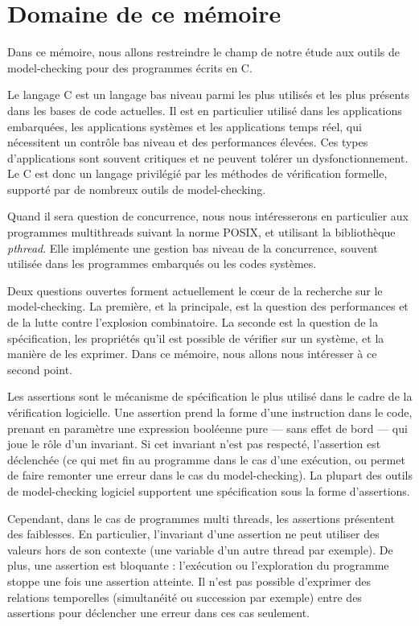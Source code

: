 \section{Domaine de ce mémoire}

Dans ce mémoire, nous allons restreindre le champ de notre étude aux
outils de model-checking pour des programmes écrits en C.

Le langage C est un langage bas niveau parmi les plus utilisés et les
plus présents dans les bases de code actuelles. Il est en particulier
utilisé dans les applications embarquées, les applications systèmes et
les applications temps réel, qui nécessitent un contrôle bas niveau et
des performances élevées. Ces types d'applications sont souvent
critiques et ne peuvent tolérer un dysfonctionnement. Le C est donc un
langage privilégié par les méthodes de vérification formelle, supporté
par de nombreux outils de model-checking.

Quand il sera question de concurrence, nous nous intéresserons en
particulier aux programmes multithreads suivant la norme POSIX, et
utilisant la bibliothèque \emph{pthread}. Elle implémente une gestion
bas niveau de la concurrence, souvent utilisée dans les programmes
embarqués ou les codes systèmes.

Deux questions ouvertes forment actuellement le cœur de la recherche
sur le model-checking. La première, et la principale, est la question
des performances et de la lutte contre l'explosion combinatoire. La
seconde est la question de la spécification, les propriétés qu'il est
possible de vérifier sur un système, et la manière de les exprimer. Dans
ce mémoire, nous allons nous intéresser à ce second point.

Les assertions sont le mécanisme de spécification le plus utilisé dans
le cadre de la vérification logicielle. Une assertion prend la forme
d'une instruction dans le code, prenant en paramètre une expression
booléenne pure --- sans effet de bord --- qui joue le rôle d'un
invariant. Si cet invariant n'est pas respecté, l'assertion est
déclenchée (ce qui met fin au programme dans le cas d'une exécution, ou
permet de faire remonter une erreur dans le cas du model-checking). La
plupart des outils de model-checking logiciel supportent une
spécification sous la forme d'assertions.

Cependant, dans le cas de programmes multi threads, les assertions
présentent des faiblesses. En particulier, l'invariant d'une assertion
ne peut utiliser des valeurs hors de son contexte (une variable d'un
autre thread par exemple). De plus, une assertion est bloquante :
l'exécution ou l'exploration du programme stoppe une fois une assertion
atteinte. Il n'est pas possible d'exprimer des relations temporelles
(simultanéité ou succession par exemple) entre des assertions pour
déclencher une erreur dans ces cas seulement.


